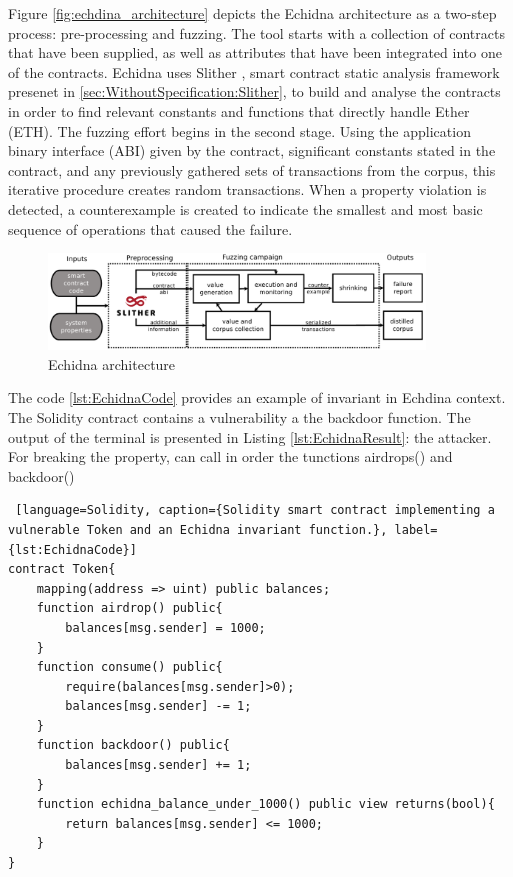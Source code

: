 Figure \autoref{fig:echdina_architecture} depicts the Echidna architecture as a two-step process: pre-processing and fuzzing.
The tool starts with a collection of contracts that have been supplied, as well as attributes that have been integrated into one of the contracts.
Echidna uses Slither , smart contract static analysis framework presenet in \autoref{sec:WithoutSpecification:Slither}, to build and analyse the contracts in order to find relevant constants and functions that directly handle Ether (ETH).
The fuzzing effort begins in the second stage. 
Using the application binary interface (ABI) given by the contract, significant constants stated in the contract, 
and any previously gathered sets of transactions from the corpus, this iterative procedure creates random transactions. 
When a property violation is detected, a counterexample is created to indicate the smallest and most basic sequence of operations that caused the failure. 

\begin{figure}
    \centering
    \includegraphics[width=10cm]{logos/echidna.png}
    \caption{Echidna architecture}
    \label{fig:echdina_architecture}
\end{figure}

The code \autoref{lst:EchidnaCode} provides an example of invariant in Echdina context. The Solidity contract contains a vulnerability a the backdoor function. 
The output of the terminal is presented in Listing \autoref{lst:EchidnaResult}: the attacker. For breaking the property, 
can call in order the tunctions airdrops() and backdoor()

\begin{lstlisting} [language=Solidity, caption={Solidity smart contract implementing a vulnerable Token and an Echidna invariant function.}, label={lst:EchidnaCode}]
contract Token{
    mapping(address => uint) public balances;
    function airdrop() public{
        balances[msg.sender] = 1000;
    }
    function consume() public{
        require(balances[msg.sender]>0);
        balances[msg.sender] -= 1;
    }
    function backdoor() public{
        balances[msg.sender] += 1;
    }
    function echidna_balance_under_1000() public view returns(bool){
        return balances[msg.sender] <= 1000;
    }
}
\end{lstlisting}

